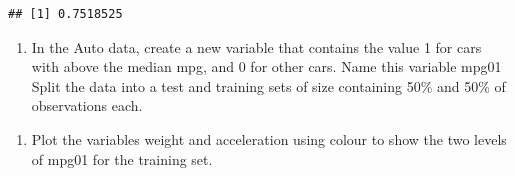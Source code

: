 \documentclass[]{article}
\newenvironment{Shaded}{\begin{snugshade}}{\end{snugshade}}
\newcommand{\DataTypeTok}[1]{\textcolor[rgb]{0.13,0.29,0.53}{#1}}
\newcommand{\DecValTok}[1]{\textcolor[rgb]{0.00,0.00,0.81}{#1}}
\newcommand{\KeywordTok}[1]{\textcolor[rgb]{0.13,0.29,0.53}{\textbf{#1}}}
\newcommand{\NormalTok}[1]{#1}
\newcommand{\OperatorTok}[1]{\textcolor[rgb]{0.81,0.36,0.00}{\textbf{#1}}}
\newcommand{\StringTok}[1]{\textcolor[rgb]{0.31,0.60,0.02}{#1}}
\providecommand{\tightlist}{%
  \setlength{\itemsep}{0pt}\setlength{\parskip}{0pt}}
\begin{document}
\begin{verbatim}
## [1] 0.7518525
\end{verbatim}

\begin{enumerate}
\def\labelenumi{\arabic{enumi}.}
\setcounter{enumi}{2}
\tightlist
\item
  In the Auto data, create a new variable that contains the value 1 for
  cars with above the median mpg, and 0 for other cars. Name this
  variable mpg01 Split the data into a test and training sets of size
  containing 50\% and 50\% of observations each.
\end{enumerate}

\begin{Shaded}
\end{Shaded}

\begin{enumerate}
\def\labelenumi{(\alph{enumi})}
\tightlist
\item
  Plot the variables weight and acceleration using colour to show the
  two levels of mpg01 for the training set.
\end{enumerate}

\begin{Shaded}
\end{Shaded}
\end{document}
